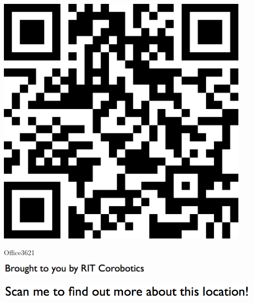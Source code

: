 \documentclass[letterpaper]{article}
\begin{document}
 \begingroup 
 \centerline{\includegraphics[scale=1,width=5in,height=5in]{Office3621.png}} 
 \endgroup 
 \vspace*{\fill} 

 \hfill{\small Office3621} 

  \vspace{0.7in} 
 
 \centerline{\includegraphics[scale=1,width=3in]{text-bottom.png}} 
 
 \pagebreak 
{} 
 \vspace*{\fill} 
 
  \centerline{\includegraphics[scale=1,width=6in]{text-top.png}} 
 
 \vspace{0.5in} 
 
\end{document}
